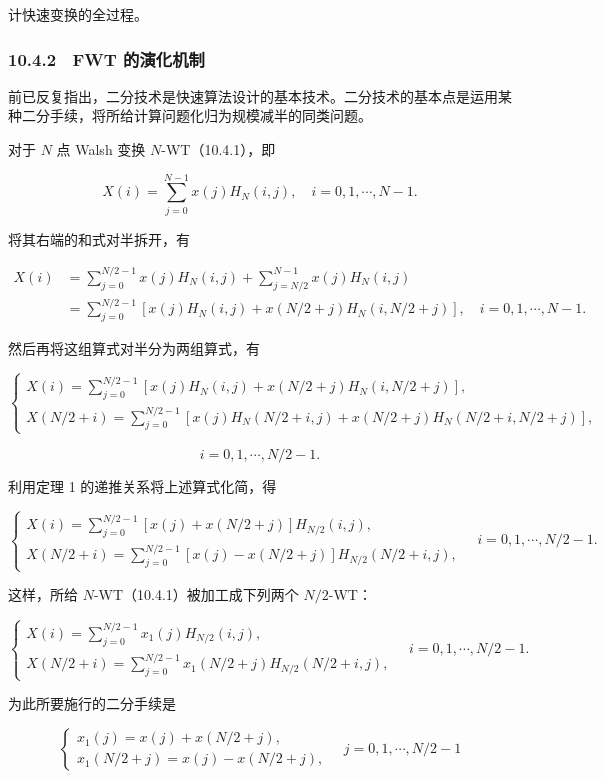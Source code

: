 \documentclass[
  10pt,
  fontset=fandol]{ctexart}
\begin{document}
计快速变换的全过程。

\subsubsection{10.4.2　FWT 的演化机制}\label{fwt-ux7684ux6f14ux5316ux673aux5236}

前已反复指出，二分技术是快速算法设计的基本技术。二分技术的基本点是运用某种二分手续，将所给计算问题化归为规模减半的同类问题。

对于 \(N\) 点 Walsh 变换 \(N\)-WT（10.4.1），即

\[
X(i)=\sum_{j=0}^{N-1}x(j)H_N(i,j),\quad i=0,1,\cdots,N-1.
\]

将其右端的和式对半拆开，有

\[
\begin{aligned}
X(i)&=\sum_{j=0}^{N/2-1}x(j)H_N(i,j)+\sum_{j=N/2}^{N-1}x(j)H_N(i,j)\\
&=\sum_{j=0}^{N/2-1}[x(j)H_N(i,j)+x(N/2+j)H_N(i,N/2+j)],\quad i=0,1,\cdots,N-1.
\end{aligned}
\]

然后再将这组算式对半分为两组算式，有

\[
\begin{cases}
\displaystyle X(i)=\sum_{j=0}^{N/2-1}[x(j)H_N(i,j)+x(N/2+j)H_N(i,N/2+j)],\\[6pt]
\displaystyle X(N/2+i)=\sum_{j=0}^{N/2-1}[x(j)H_N(N/2+i,j)+x(N/2+j)H_N(N/2+i,N/2+j)],
\end{cases}
\]

\[
i=0,1,\cdots,N/2-1.
\]

利用定理 1 的递推关系将上述算式化简，得

\[
\begin{cases}
\displaystyle X(i)=\sum_{j=0}^{N/2-1}[x(j)+x(N/2+j)]H_{N/2}(i,j),\\[6pt]
\displaystyle X(N/2+i)=\sum_{j=0}^{N/2-1}[x(j)-x(N/2+j)]H_{N/2}(N/2+i,j),
\end{cases}\quad i=0,1,\cdots,N/2-1.
\]

这样，所给 \(N\)-WT（10.4.1）被加工成下列两个 \(N/2\)-WT：

\[
\begin{cases}
\displaystyle X(i)=\sum_{j=0}^{N/2-1}x_1(j)H_{N/2}(i,j),\\[6pt]
\displaystyle X(N/2+i)=\sum_{j=0}^{N/2-1}x_1(N/2+j)H_{N/2}(N/2+i,j),
\end{cases}\quad i=0,1,\cdots,N/2-1.
\]

为此所要施行的二分手续是

\[
\begin{cases}
x_1(j)=x(j)+x(N/2+j),\\
x_1(N/2+j)=x(j)-x(N/2+j),
\end{cases}\quad j=0,1,\cdots,N/2-1
\tag{10.4.2}
\]
\end{document}

